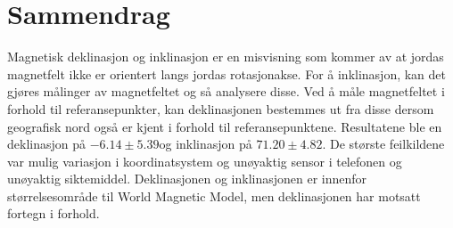 
\section*{Sammendrag}

Magnetisk deklinasjon og inklinasjon er en misvisning som kommer av at jordas magnetfelt ikke er orientert langs jordas 
rotasjonakse. For å inklinasjon, kan det 
gjøres målinger av magnetfeltet og så analysere disse. Ved å måle magnetfeltet i forhold til referansepunkter, kan 
deklinasjonen bestemmes ut fra disse dersom geografisk nord også er kjent i forhold til referansepunktene. Resultatene ble en deklinasjon på $-6.14\pm{5.39}$\textdegree og inklinasjon på 
$71.20\pm{4.82}$\textdegree. De største feilkildene var mulig variasjon i koordinatsystem og unøyaktig sensor i telefonen 
og unøyaktig siktemiddel. Deklinasjonen og inklinasjonen er innenfor størrelsesområde til World Magnetic Model, men 
deklinasjonen har motsatt fortegn i forhold.


